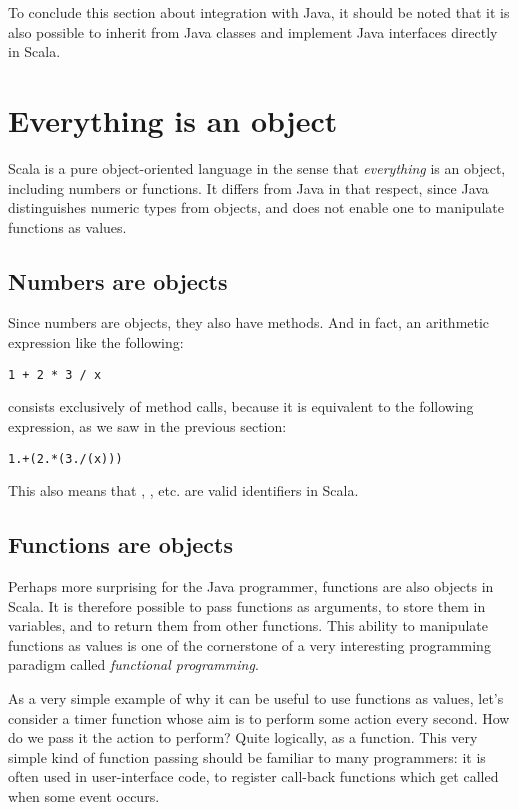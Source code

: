 \documentclass[a4paper,12pt,twoside,titlepage]{article}
\newcommand{\langname}[1]{#1\xspace}
\newcommand{\Scala}{\langname{Scala}}
\newcommand{\Java}{\langname{Java}}
\begin{document}
To conclude this section about integration with \Java, it should be
noted that it is also possible to inherit from \Java classes and
implement \Java interfaces directly in \Scala.

\section{Everything is an object}
\label{sec:everything-an-object}

\Scala is a pure object-oriented language in the sense that
\emph{everything} is an object, including numbers or functions. It
differs from \Java in that respect, since \Java distinguishes numeric
types from objects, and does not enable one to manipulate functions as
values.

\subsection{Numbers are objects}
\label{sec:numbers-are-objects}

Since numbers are objects, they also have methods. And in fact, an
arithmetic expression like the following:
\begin{lstlisting}
1 + 2 * 3 / x
\end{lstlisting}
consists exclusively of method calls, because it is equivalent to the
following expression, as we saw in the previous section:
\begin{lstlisting}
1.+(2.*(3./(x)))
\end{lstlisting}
This also means that \code{+}, \code{*}, etc. are valid identifiers
in \Scala.

\subsection{Functions are objects}
\label{sec:funct-are-objects}

Perhaps more surprising for the \Java programmer, functions are also
objects in \Scala. It is therefore possible to pass functions as
arguments, to store them in variables, and to return them from other
functions. This ability to manipulate functions as values is one of
the cornerstone of a very interesting programming paradigm called
\emph{functional programming}.

As a very simple example of why it can be useful to use functions as
values, let's consider a timer function whose aim is to perform some
action every second. How do we pass it the action to perform? Quite
logically, as a function. This very simple kind of function passing
should be familiar to many programmers: it is often used in
user-interface code, to register call-back functions which get called
when some event occurs.
\end{document}
